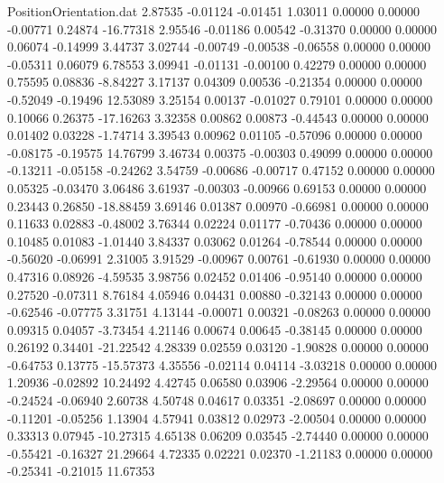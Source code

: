 \begin{filecontents}{PositionOrientation.dat}
   2.87535   -0.01124   -0.01451     1.03011    0.00000    0.00000   -0.00771    0.24874  -16.77318
   2.95546   -0.01186    0.00542    -0.31370    0.00000    0.00000    0.06074   -0.14999    3.44737
   3.02744   -0.00749   -0.00538    -0.06558    0.00000    0.00000   -0.05311    0.06079    6.78553
   3.09941   -0.01131   -0.00100     0.42279    0.00000    0.00000    0.75595    0.08836   -8.84227
   3.17137    0.04309    0.00536    -0.21354    0.00000    0.00000   -0.52049   -0.19496   12.53089
   3.25154    0.00137   -0.01027     0.79101    0.00000    0.00000    0.10066    0.26375  -17.16263
   3.32358    0.00862    0.00873    -0.44543    0.00000    0.00000    0.01402    0.03228   -1.74714
   3.39543    0.00962    0.01105    -0.57096    0.00000    0.00000   -0.08175   -0.19575   14.76799
   3.46734    0.00375   -0.00303     0.49099    0.00000    0.00000   -0.13211   -0.05158   -0.24262
   3.54759   -0.00686   -0.00717     0.47152    0.00000    0.00000    0.05325   -0.03470    3.06486
   3.61937   -0.00303   -0.00966     0.69153    0.00000    0.00000    0.23443    0.26850  -18.88459
   3.69146    0.01387    0.00970    -0.66981    0.00000    0.00000    0.11633    0.02883   -0.48002
   3.76344    0.02224    0.01177    -0.70436    0.00000    0.00000    0.10485    0.01083   -1.01440
   3.84337    0.03062    0.01264    -0.78544    0.00000    0.00000   -0.56020   -0.06991    2.31005
   3.91529   -0.00967    0.00761    -0.61930    0.00000    0.00000    0.47316    0.08926   -4.59535
   3.98756    0.02452    0.01406    -0.95140    0.00000    0.00000    0.27520   -0.07311    8.76184
   4.05946    0.04431    0.00880    -0.32143    0.00000    0.00000   -0.62546   -0.07775    3.31751
   4.13144   -0.00071    0.00321    -0.08263    0.00000    0.00000    0.09315    0.04057   -3.73454
   4.21146    0.00674    0.00645    -0.38145    0.00000    0.00000    0.26192    0.34401  -21.22542
   4.28339    0.02559    0.03120    -1.90828    0.00000    0.00000   -0.64753    0.13775  -15.57373
   4.35556   -0.02114    0.04114    -3.03218    0.00000    0.00000    1.20936   -0.02892   10.24492
   4.42745    0.06580    0.03906    -2.29564    0.00000    0.00000   -0.24524   -0.06940    2.60738
   4.50748    0.04617    0.03351    -2.08697    0.00000    0.00000   -0.11201   -0.05256    1.13904
   4.57941    0.03812    0.02973    -2.00504    0.00000    0.00000    0.33313    0.07945  -10.27315
   4.65138    0.06209    0.03545    -2.74440    0.00000    0.00000   -0.55421   -0.16327   21.29664
   4.72335    0.02221    0.02370    -1.21183    0.00000    0.00000   -0.25341   -0.21015   11.67353

\end{filecontents}
